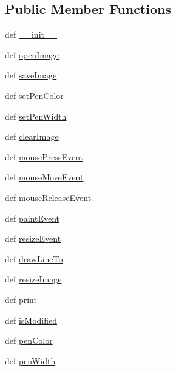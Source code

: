 \subsection*{Public Member Functions}
\begin{DoxyCompactItemize}
\item 
def \hyperlink{classscribble_1_1ScribbleArea_a6742dd7ec960e583158114927d687d9b}{\+\_\+\+\_\+init\+\_\+\+\_\+}
\item 
def \hyperlink{classscribble_1_1ScribbleArea_ae3d801e0274e24d8f4ace96c2b1902ee}{open\+Image}
\item 
def \hyperlink{classscribble_1_1ScribbleArea_adb6cfdb65884bbbc8bbeb455bbb36b10}{save\+Image}
\item 
def \hyperlink{classscribble_1_1ScribbleArea_ac235070692806e17fdb06e9f9eab7734}{set\+Pen\+Color}
\item 
def \hyperlink{classscribble_1_1ScribbleArea_a6c882b6cc4bd51c6a1d3eea5f093a9fc}{set\+Pen\+Width}
\item 
def \hyperlink{classscribble_1_1ScribbleArea_af608d96ade87086ed6831093eb93123d}{clear\+Image}
\item 
def \hyperlink{classscribble_1_1ScribbleArea_a2788684fee2cf458bc44863b4465e5c3}{mouse\+Press\+Event}
\item 
def \hyperlink{classscribble_1_1ScribbleArea_aee479f6c2260b77e1faae5e05f8ece30}{mouse\+Move\+Event}
\item 
def \hyperlink{classscribble_1_1ScribbleArea_ab0ea2097d11a11890418fc634b0f2e70}{mouse\+Release\+Event}
\item 
def \hyperlink{classscribble_1_1ScribbleArea_a6e4cb77e7856e7b864f6e799d8c00f97}{paint\+Event}
\item 
def \hyperlink{classscribble_1_1ScribbleArea_a78c36b16ed0c30189ee270f5d66dbb40}{resize\+Event}
\item 
def \hyperlink{classscribble_1_1ScribbleArea_af5f7b648777bb7866636022fb8ab1470}{draw\+Line\+To}
\item 
def \hyperlink{classscribble_1_1ScribbleArea_a6a8648695e64a6fce763d829f07b5450}{resize\+Image}
\item 
def \hyperlink{classscribble_1_1ScribbleArea_aaaacb1c444dfad820a742364601243c8}{print\+\_\+}
\item 
def \hyperlink{classscribble_1_1ScribbleArea_a991aecaac2f564780718227897706702}{is\+Modified}
\item 
def \hyperlink{classscribble_1_1ScribbleArea_ab80378614b1b10497b3dc50f1534f865}{pen\+Color}
\item 
def \hyperlink{classscribble_1_1ScribbleArea_a05f17c20152c6dc33bdf69cb55b46790}{pen\+Width}
\end{DoxyCompactItemize}
